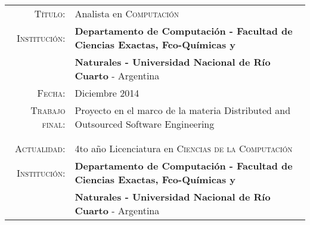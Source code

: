 \documentclass[a4paper,10pt]{article} %
\begin{document}
\begin{tabular}{rl}

\\	


\textsc{Título:} & Analista en \textsc{Computación} \\
\textsc{Institución:} & \textbf{Departamento de Computación - Facultad de Ciencias Exactas, Fco-Químicas y} \\   
& \textbf{Naturales - Universidad Nacional de Río Cuarto} - Argentina \\
\textsc{Fecha:} & Diciembre 2014 \\
\textsc{Trabajo final:} & Proyecto en el marco de la materia Distributed and Outsourced Software Engineering \\ 
& \\ \\




\textsc{Actualidad:} & 4to año Licenciatura en \textsc{Ciencias de la Computación} \\
\textsc{Institución:} & \textbf{Departamento de Computación - Facultad de Ciencias Exactas, Fco-Químicas y} \\  
& \textbf{Naturales - Universidad Nacional de Río Cuarto} - Argentina \\ 
\end{tabular} 
\end{document}
